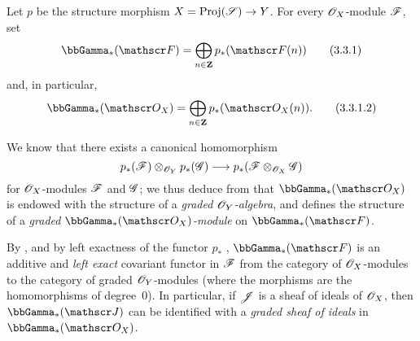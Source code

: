 \begin{env}[3.3.1]
\label{II.3.3.1}
Let $p$ be the structure morphism $X=\Proj(\sh{S})\to Y$.
For every $\mathscr{O}_X$-module $\mathscr{F}$, set
\[
\label{II.3.3.1.1}
  \bbGamma_*(\sh{F}) = \bigoplus_{n\in\bb{Z}}p_*(\sh{F}(n))
\tag{3.3.1}
\]
and, in particular,
\[
\label{II.3.3.1.2}
  \bbGamma_*(\sh{O}_X) = \bigoplus_{n\in\bb{Z}}p_*(\sh{O}_X(n)).
\tag{3.3.1.2}
\]

We know  that there exists a canonical homomorphism
\[
  p_*(\sh{F})\otimes_{\sh{O}_Y}p_*(\sh{G}) \to p_*(\sh{F}\otimes_{\sh{O}_X}\sh{G})
\]
for $\mathscr{O}_X$-modules $\mathscr{F}$ and $\mathscr{G}$;
we thus deduce from  that $\bbGamma_*(\sh{O}_X)$ is endowed with the structure of a \emph{graded $\mathscr{O}_Y$-algebra}, and  defines the structure of a \emph{graded $\bbGamma_*(\sh{O}_X)$-module} on $\bbGamma_*(\sh{F})$.

By , and by left exactness of the functor $p_*$ , $\bbGamma_*(\sh{F})$ is an additive and \emph{left exact} covariant functor in $\mathscr{F}$ from the category of $\mathscr{O}_X$-modules to the category of graded $\mathscr{O}_Y$-modules (where the morphisms are the homomorphisms of degree~$0$).
In particular, if $\mathscr{J}$ is a sheaf of ideals of $\mathscr{O}_X$, then $\bbGamma_*(\sh{J})$ can be identified with a \emph{graded sheaf of ideals} in $\bbGamma_*(\sh{O}_X)$.
\end{env}

